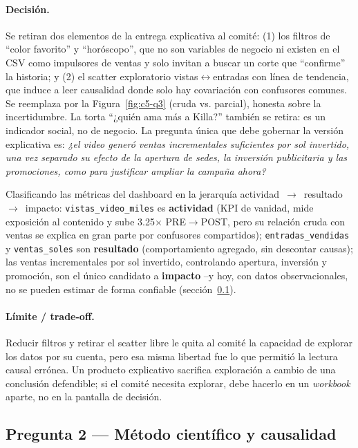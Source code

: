 \paragraph{Decisión.} Se retiran dos elementos de la entrega explicativa al comité: (1) los filtros de ``color favorito'' y ``horóscopo'', que no son variables de negocio ni existen en el CSV como impulsores de ventas y solo invitan a buscar un corte que ``confirme'' la historia; y (2) el scatter exploratorio vistas$\leftrightarrow$entradas con línea de tendencia, que induce a leer causalidad donde solo hay covariación con confusores comunes. Se reemplaza por la Figura~\ref{fig:c5-q3} (cruda vs. parcial), honesta sobre la incertidumbre. La torta ``¿quién ama más a Killa?'' también se retira: es un indicador social, no de negocio. La pregunta única que debe gobernar la versión explicativa es: \emph{¿el video generó ventas incrementales suficientes por sol invertido, una vez separado su efecto de la apertura de sedes, la inversión publicitaria y las promociones, como para justificar ampliar la campaña ahora?}

Clasificando las métricas del dashboard en la jerarquía actividad~$\to$~resultado~$\to$~impacto: \texttt{vistas\_video\_miles} es \textbf{actividad} (KPI de vanidad, mide exposición al contenido y sube 3.25$\times$ PRE$\to$POST, pero su relación cruda con ventas se explica en gran parte por confusores compartidos); \texttt{entradas\_vendidas} y \texttt{ventas\_soles} son \textbf{resultado} (comportamiento agregado, sin descontar causas); las ventas incrementales por sol invertido, controlando apertura, inversión y promoción, son el único candidato a \textbf{impacto} --y hoy, con datos observacionales, no se pueden estimar de forma confiable (sección~\ref{ssec:c5-q2}).

\paragraph{Límite / trade-off.} Reducir filtros y retirar el scatter libre le quita al comité la capacidad de explorar los datos por su cuenta, pero esa misma libertad fue lo que permitió la lectura causal errónea. Un producto explicativo sacrifica exploración a cambio de una conclusión defendible; si el comité necesita explorar, debe hacerlo en un \emph{workbook} aparte, no en la pantalla de decisión.

\subsection{Pregunta 2 --- Método científico y causalidad}\label{ssec:c5-q2}

